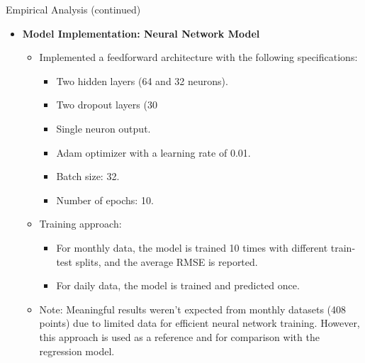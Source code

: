 \documentclass{beamer}
\begin{document}
\begin{frame}{Empirical Analysis (continued)}
  \begin{itemize}
    \item \textbf{Model Implementation: Neural Network Model}
      \begin{itemize}
        \item Implemented a feedforward architecture with the following specifications:
          \begin{itemize}
            \item Two hidden layers (64 and 32 neurons).
            \item Two dropout layers (30%
            \item Single neuron output.
            \item Adam optimizer with a learning rate of 0.01.
            \item Batch size: 32.
            \item Number of epochs: 10.
          \end{itemize}
        \item Training approach:
          \begin{itemize}
            \item For monthly data, the model is trained 10 times with different train-test splits, and the average RMSE is reported.
            \item For daily data, the model is trained and predicted once.
          \end{itemize}
        \item Note: Meaningful results weren't expected from monthly datasets (408 points) due to limited data for efficient neural network training. However, this approach is used as a reference and for comparison with the regression model.
      \end{itemize}
  \end{itemize}
\end{frame}
\end{document}
